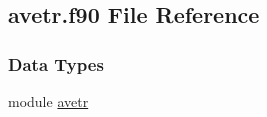 \hypertarget{avetr_8f90}{\subsection{avetr.\-f90 File Reference}
\label{avetr_8f90}
}
\subsubsection*{Data Types}
\begin{DoxyCompactItemize}
\item 
module \hyperlink{classavetr}{avetr}
\end{DoxyCompactItemize}
